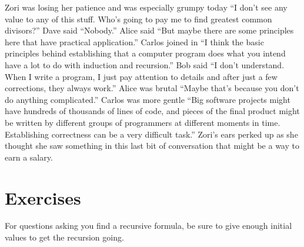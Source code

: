 Zori was losing her patience and was especially grumpy today ``I don't
see any value to any of this stuff.  Who's going to pay me to find
greatest common divisors?''  Dave said ``Nobody.''  Alice said ``But
maybe there are some principles here that have practical application.''
Carlos joined in ``I think the basic principles behind establishing
that a computer program does what you intend have a lot to do with
induction and recursion.''  Bob said ``I don't understand.  When
I write a program, I just pay attention to details and after just 
a few corrections, they always work.''  Alice was brutal ``Maybe that's
because you don't do anything complicated.''  Carlos was more gentle
``Big software projects might have hundreds of thousands of lines
of code, and pieces of the final product might be written by
different groups of programmers at different moments in time.
Establishing correctness can be a very difficult task.''
Zori's ears perked up as she thought she saw something in
this last bit of conversation that might be a way to earn a salary.

\section{Exercises}\label{s:induction:exercises}

For questions asking you find a recursive formula, be sure to give
enough initial values to get the recursion going.

